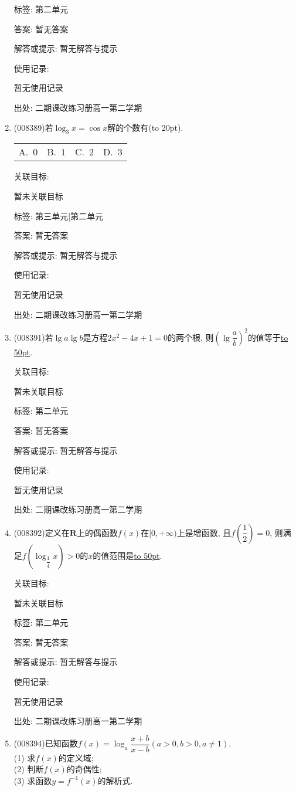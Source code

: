 \documentclass[10pt,a4paper]{article}
\newcommand{\blank}[1]{\underline{\hbox to #1pt{}}}
\newcommand{\bracket}[1]{(\hbox to #1pt{})}
\newcommand{\fourch}[4]{\par\begin{tabular}{p{.23\textwidth}p{.23\textwidth}p{.23\textwidth}p{.23\textwidth}}
A.~#1 &B.~#2& C.~#3& D.~#4
\end{tabular}}
\begin{document}
\begin{enumerate}[1.]
标签: 第二单元

答案: 暂无答案

解答或提示: 暂无解答与提示

使用记录:

暂无使用记录


出处: 二期课改练习册高一第二学期
\item { (008389)}若$\log _3x=\cos x$解的个数有\bracket{20}.
\fourch{$0$}{$1$}{$2$}{$3$}


关联目标:

暂未关联目标



标签: 第三单元|第二单元

答案: 暂无答案

解答或提示: 暂无解答与提示

使用记录:

暂无使用记录


出处: 二期课改练习册高一第二学期
\item { (008391)}若$\lg a\lg b$是方程$2x^2-4x+1=0$的两个根, 则$(\lg \dfrac ab)^2$的值等于\blank{50}.


关联目标:

暂未关联目标



标签: 第二单元

答案: 暂无答案

解答或提示: 暂无解答与提示

使用记录:

暂无使用记录


出处: 二期课改练习册高一第二学期
\item { (008392)}定义在$\mathbf{R}$上的偶函数$f(x)$在$[0,+\infty)$上是增函数, 且$f(\dfrac 12)=0$, 则满足$f(\log _{\dfrac 14}x)>0$的$x$的值范围是\blank{50}.


关联目标:

暂未关联目标



标签: 第二单元

答案: 暂无答案

解答或提示: 暂无解答与提示

使用记录:

暂无使用记录


出处: 二期课改练习册高一第二学期
\item { (008394)}已知函数$f(x)=\log _a\dfrac{x+b}{x-b}(a>0,b>0, a\ne 1)$.\\
(1) 求$f(x)$的定义域;\\
(2) 判断$f(x)$的奇偶性;\\
(3) 求函数$y=f^{-1}(x)$的解析式.



\end{enumerate}
\end{document}
